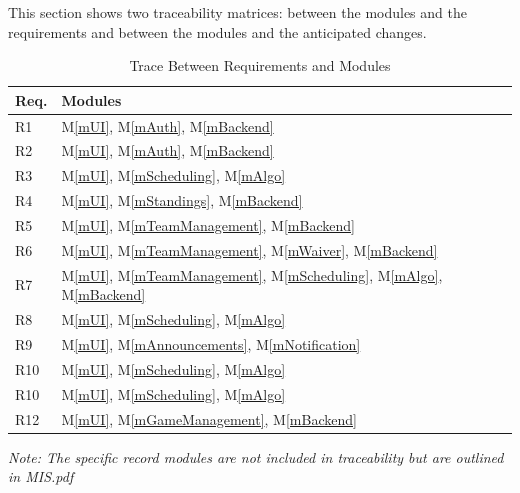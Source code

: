 \documentclass[12pt, titlepage]{article}
\newcommand{\mref}[1]{M\ref{#1}}
\begin{document}
This section shows two traceability matrices: between the modules and the
requirements and between the modules and the anticipated changes.

\begin{table}[H]
  \centering
  \begin{tabular}{p{} p{}}
    \toprule
    \textbf{Req.} & \textbf{Modules}                                                                      \\
    \midrule
    R1            & \mref{mUI}, \mref{mAuth}, \mref{mBackend}                                             \\
    R2            & \mref{mUI}, \mref{mAuth}, \mref{mBackend}                                             \\
    R3            & \mref{mUI}, \mref{mScheduling}, \mref{mAlgo}                                          \\
    R4            & \mref{mUI}, \mref{mStandings}, \mref{mBackend}                                        \\
    R5            & \mref{mUI}, \mref{mTeamManagement}, \mref{mBackend}                                   \\
    R6            & \mref{mUI}, \mref{mTeamManagement}, \mref{mWaiver}, \mref{mBackend}                   \\
    R7            & \mref{mUI}, \mref{mTeamManagement}, \mref{mScheduling}, \mref{mAlgo}, \mref{mBackend} \\
    R8            & \mref{mUI}, \mref{mScheduling}, \mref{mAlgo}                                          \\
    R9            & \mref{mUI}, \mref{mAnnouncements}, \mref{mNotification}                               \\
    R10           & \mref{mUI}, \mref{mScheduling}, \mref{mAlgo}                                          \\
    R10           & \mref{mUI}, \mref{mScheduling}, \mref{mAlgo}                                          \\
    R12           & \mref{mUI}, \mref{mGameManagement}, \mref{mBackend}                                   \\
    \bottomrule
  \end{tabular}
  \caption{Trace Between Requirements and Modules}
  \textit{Note: The specific record modules are not included in traceability but are outlined in MIS.pdf}
  \label{TblRT}
\end{table}
\end{document}
